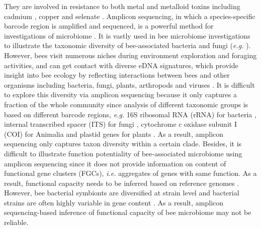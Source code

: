 \documentclass[11pt]{article}
\begin{document}
  They are involved in resistance to both metal and metalloid toxins including cadmium \citep{rothman2019cadmium}, copper \citep{rothman2020direct} and selenate \citep{rothman2019bumble}. 
  \newline
  Amplicon sequencing, in which a species-specific barcode region is amplified and sequenced, is a powerful method for investigations of microbiome \citep{abdelfattah2018metabarcoding}.  
  It is vastly used in bee microbiome investigations to illustrate the taxonomic diversity of bee-associated bacteria and fungi (\textit{e.g.} \cite{geldert2021dietary,wang2021gut,powell9field,kapheim2021composition}). 
  However, bees visit numerous niches during environment exploration and foraging activities, and can get contact with diverse eDNA signatures, which provide insight into bee ecology by reflecting interactions between bees and other organisms including bacteria, fungi, plants, arthropods and viruses \citep{bovo2018shotgun,ribani2020honey,bovo2020shotgun,matsuzawa2020application}. 
  It is difficult to explore this diversity via amplicon sequencing because it only captures a fraction of the whole community since analysis of different taxonomic groups is based on different barcode regions, \textit{e.g.} 16S ribosomal RNA (rRNA) for bacteria \citep{hayashi2002phylogenetic,eckburg2005diversity}, internal transcribed spacer (ITS) for fungi \citep{nilsson2008intraspecific}, cytochrome c oxidase subunit I (COI) for Animalia \citep{hebert2003barcoding} 
  and plastid genes for plants \citep{group2009dna}. 
  As a result, amplicon sequencing only captures taxon diversity within a certain clade. 
  Besides, it is difficult to illustrate function potentiality of bee-associated microbiome using amplicon sequencing since it does not provide information on content of functional gene clusters (FGCs), \textit{i.e.} aggregates of genes with same function. 
  As a result, functional capacity needs to be inferred based on reference genomes \citep{asshauer2015tax4fun,douglas2018predicting}. 
  However, bee bacterial symbionts are diversified at strain level \citep{engel2012functional,powell2016strain,ellegaard2020vast} and bacterial strains are often highly variable in gene content \citep{cordero2014explaining,brockhurst2019ecology}. 
  As a result, amplicon sequencing-based inference of functional capacity of bee microbiome may not be reliable.
\end{document}

